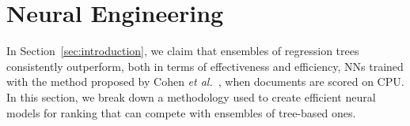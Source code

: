 
	




\section{Neural Engineering}
\label{sec:neuraleng}
In Section~\ref{sec:introduction}, we claim that ensembles of regression trees consistently outperform, both in terms of effectiveness and efficiency, NNs trained with the method proposed by Cohen \textit{et al.}~\cite{cohen2018universal}, when documents are scored on CPU. In this section, we break down a methodology used to create efficient neural models for ranking that can compete with ensembles of tree-based ones.

